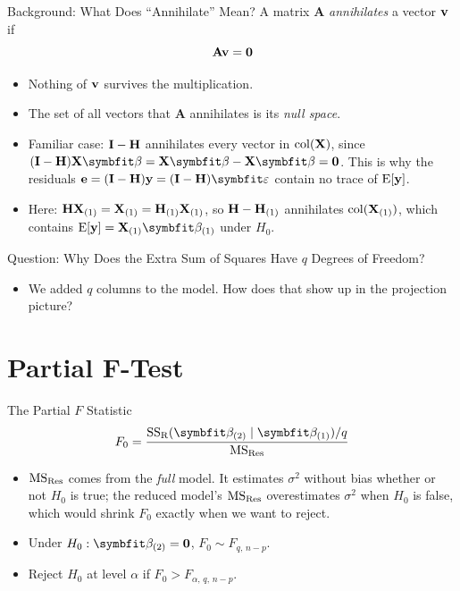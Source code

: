 \begin{frame}{Background: What Does ``Annihilate'' Mean?}
    A matrix $\mathbf{A}$ \emph{annihilates} a vector $\mathbf{v}$ if
    \[
        \mathbf{A}\mathbf{v}=\mathbf{0}
    \]
    \begin{itemize}
        \item Nothing of $\mathbf{v}$ survives the multiplication.
        \item The set of all vectors that $\mathbf{A}$ annihilates is its \emph{null space}.
        \item Familiar case: $\mathbf{I}-\mathbf{H}$ annihilates every vector in $\operatorname{col}(\mathbf{X})$, since $(\bI-\bH)\bX\bbeta=\bX\bbeta-\bX\bbeta=\bzero$. This is why the residuals $\be=(\bI-\bH)\by=(\bI-\bH)\bvarepsilon$ contain no trace of $\operatorname{E}[\mathbf{y}]$.
        \item Here: $\mathbf{H}\mathbf{X}_{(1)}=\mathbf{X}_{(1)}=\mathbf{H}_{(1)}\mathbf{X}_{(1)}$, so $\mathbf{H}-\mathbf{H}_{(1)}$ annihilates $\operatorname{col}(\mathbf{X}_{(1)})$, which contains $\E[\by]=\bX_{(1)}\bbeta_{(1)}$ under $H_0$.
    \end{itemize}
\end{frame}


\begin{frame}{Question: Why Does the Extra Sum of Squares Have $q$ Degrees of Freedom?}
    \begin{itemize}
        \item We added $q$ columns to the model. How does that show up in the projection picture?
    \end{itemize}
\end{frame}


\section{Partial F-Test}


\begin{frame}{The Partial $F$ Statistic}
    \begin{align}
        F_0 = \frac{\SSR(\bbeta_{(2)}\mid\bbeta_{(1)})/q}{\MSRes}
        \label{eq:partial-F}
    \end{align}
    \begin{itemize}
        \item $\mathrm{MS}_{\mathrm{Res}}$ comes from the \emph{full} model. It estimates $\sigma^2$ without bias whether or not $H_0$ is true; the reduced model's $\mathrm{MS}_{\mathrm{Res}}$ overestimates $\sigma^2$ when $H_0$ is false, which would shrink $F_0$ exactly when we want to reject.
        \item Under $H_0:\bbeta_{(2)}=\bzero$, $F_0\sim F_{q,\,n-p}$.
        \item Reject $H_0$ at level $\alpha$ if $F_0>F_{\alpha,\,q,\,n-p}$.
    \end{itemize}
\end{frame}


